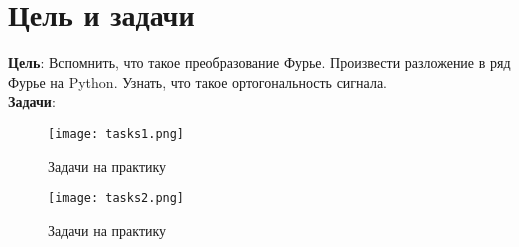 \chapter*{Цель и задачи}
\label{ch:intro}

\textbf{Цель}: Вспомнить, что такое преобразование Фурье. Произвести разложение в ряд Фурье на Python. Узнать, что такое
ортогональность сигнала.
\\\textbf{Задачи}: \\

\begin{figure}[H]
    \centering
    \texttt{[image: tasks1.png]}
    \caption{Задачи на практику}
\end{figure}

\begin{figure}[H]
    \centering
    \texttt{[image: tasks2.png]}
    \caption{Задачи на практику}
\end{figure}

\endinput